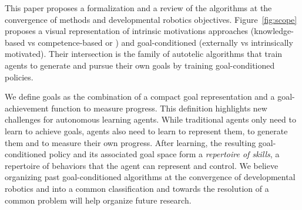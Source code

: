 This paper proposes a formalization and a review of the \rlimgep algorithms at the convergence of \rl methods and developmental robotics objectives. Figure~\ref{fig:scope} proposes a visual representation of intrinsic motivations approaches (knowledge-based \ims vs competence-based \ims or \imgeps) and goal-conditioned \rl (externally vs intrinsically motivated). Their intersection is the family of autotelic algorithms that train agents to generate and pursue their own goals by training goal-conditioned policies. 

We define goals as the combination of a compact goal representation and a goal-achievement function to measure progress. This definition highlights new challenges for autonomous learning agents. While traditional \rl agents only need to learn to achieve goals, \rlimgep agents also need to learn to represent them, to generate them and to measure their own
progress. After learning, the resulting goal-conditioned policy and its associated goal space form a \textit{repertoire of skills}, a repertoire of behaviors that the agent can represent and control. We believe organizing past goal-conditioned \rl algorithms at the convergence of developmental robotics and \rl into a common classification and towards the resolution of a common problem will help organize future research.






